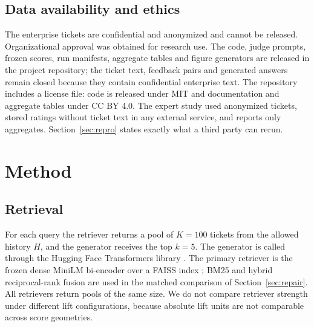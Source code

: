 \documentclass{ieeeaccess}
\begin{document}
\subsection{Data availability and ethics}
The enterprise tickets are confidential and anonymized and cannot be released.
Organizational approval was obtained for research use. The code, judge prompts,
frozen scores, run manifests, aggregate tables and figure generators are released in
the project repository; the ticket text, feedback pairs and generated answers remain
closed because they contain confidential enterprise text. The repository includes a
license file: code is released under MIT and documentation and aggregate tables
under CC BY 4.0. The expert study used anonymized tickets, stored ratings without
ticket text in any external service, and reports only aggregates. Section~\ref{sec:repro}
states exactly what a third party can rerun.


\section{Method}
\label{sec:method}

\subsection{Retrieval}
For each query the retriever returns a pool of $K=100$ tickets from the allowed
history $H$, and the generator receives the top $k=5$. The generator is called
through the Hugging Face Transformers library \cite{b29}. The primary retriever is
the frozen dense MiniLM bi-encoder \cite{b2,b28} over a FAISS index \cite{b3}; BM25
\cite{b4} and hybrid reciprocal-rank fusion \cite{b5} are used in the matched
comparison of Section~\ref{sec:repair}. All retrievers return pools of the same
size. We do not compare retriever strength under different lift configurations,
because absolute lift units are not comparable across score geometries.
\end{document}

